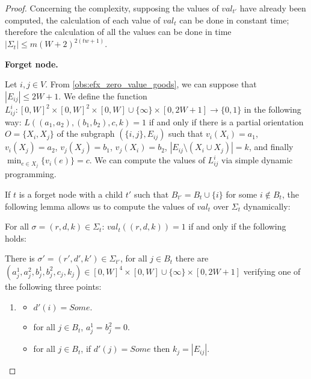 \begin{proof}
    Concerning the complexity, supposing the values of $val_{t'}$ have already been computed, the calculation of each value of $val_t$ can be done in constant time; therefore the calculation of all the values can be done in time $|\Sigma_t|\leq m(W+2)^{2(tw+1)}$.

    \textbf{Forget node.}

    Let $i,j\in V$. From \cref{obs:efx_zero_value_goods}, we can suppose that $|E_{ij}|\leq 2W +1$. We define the function $L_{ij}^i\colon [0,W]^2\times [0,W]^2\times[0,W]\cup\{\infty\}\times[0,2W+1]\to \{0,1\} $ in the following way:
    $L((a_1,a_2),(b_1,b_2),c,k)=1$ if and only if there is a partial orientation  $O=\{X_i,X_j\}$ of the subgraph $(\{i,j\},E_{ij})$ such that $v_i(X_i)=a_1$, $v_i(X_j)=a_2$, $v_j(X_j)=b_1$, $v_j(X_i)=b_2$, $|E_{ij}\setminus (X_i\cup X_j)|=k$, and finally $\min_{e\in X_j}\{v_i(e)\}=c$. We can compute the values of $L_{ij}^i$ via simple dynamic programming.%

    If $t$ is a forget node with a child $t'$ such that $B_{t'}=B_t\cup \{i\}$ for some $i\notin B_t$, the following lemma allows us to compute the values of $val_t$ over $\Sigma_t$ dynamically:

    \begin{lemma}
        For all $\sigma=(r,d,k)\in \Sigma_t$: $val_t((r,d,k))=1$ if and only if the following holds:


        There is $\sigma'=(r',d',k')\in \Sigma_{t'}$, for all $j\in B_t$ there are $(a_j^1,a_j^2,b_j^1,b_j^2,c_j,k_j)\in [0,W]^4\times [0,W]\cup\{\infty\}\times [0,2W+1]$ verifying one of the following three points:

        \begin{enumerate}
            \item \begin{itemize}
                \item $d'(i)=Some$.
                \item for all $j\in B_t$, $a_j^1=b_j^2=0$.
                \item for all $j\in B_t$, if $d'(j)=Some$ then $k_j=|E_{ij}|$.
                \end{itemize}


\end{enumerate}
\end{lemma}
\end{proof}
